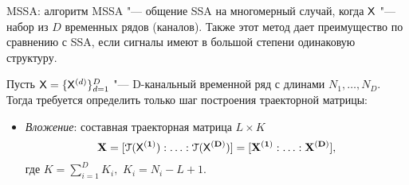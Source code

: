\documentclass[ucs, notheorems, handout]{beamer}
\begin{document}
\begin{frame}{MSSA: алгоритм}
	MSSA "--- общение SSA на многомерный случай, когда $\mathsf{X}$ "--- набор из $D$ временных рядов (каналов). Также этот метод дает преимущество по сравнению с SSA, если сигналы имеют в большой степени одинаковую структуру. \medskip
	
	Пусть $\mathsf{X}=\{\mathsf{X}^{(d)}\}_{d=1}^D$ "--- D-канальный временной ряд с длинами $N_1,\ldots,N_D$. Тогда требуется определить только шаг построения траекторной матрицы:\medskip
	
	\begin{itemize}
		\item \emph{Вложение}: составная траекторная матрица $L\times K$  $$\bf{X}=[\EuScript{T}(\mathsf{X}^{(1)}):\ldots:\EuScript{T}(\mathsf{X}^{(D)})]=[\mathbf{X}^{(1)}:\ldots:\mathbf{X}^{(D)}],$$ где $K=\sum_{i=1}^D K_i,$ $K_i=N_i-L+1$.
		
	\end{itemize}
			
\end{frame}
\end{document}
